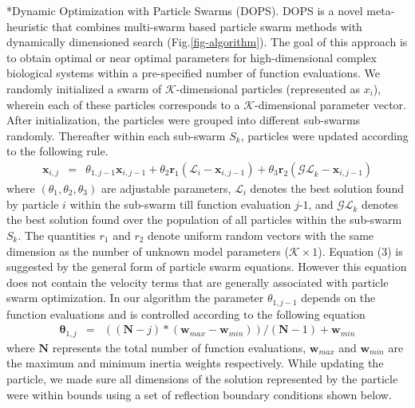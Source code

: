 \documentclass[12pt]{article}
\makeatletter
\renewcommand\subsection{\@startsection
	{subsection}{2}{0mm}
	{-0.05in}
	{-0.5\baselineskip}
	{\normalfont\normalsize\bfseries}}
\makeatother
\begin{document}
\subsection*{Dynamic Optimization with Particle Swarms (DOPS).}
DOPS is a novel meta-heuristic that combines multi-swarm based particle swarm methods with dynamically dimensioned search (Fig.\ref{fig-algorithm}).
The goal of this approach is to obtain optimal or near optimal parameters for high-dimensional complex biological systems within a pre-specified number of function evaluations. We randomly initialized a swarm of $\mathcal{K}$-dimensional particles (represented as ${x}_{i}$), wherein each of these particles corresponds to a $\mathcal{K}$-dimensional parameter vector. After initialization, the particles were grouped into different sub-swarms randomly. Thereafter within each sub-swarm ${S}_{k}$,  particles were updated according to the following rule.
\begin{eqnarray}
	\mathbf{x}_{i,j} &=&\theta_{1,j-1}\mathbf{x}_{i,j-1} + \theta_{2}\mathbf{r}_{1}\left(\mathcal{L}_{i} - \mathbf{x}_{i,j-1}\right) + \theta_{3}\mathbf{r}_{2}\left(\mathcal{GL}_{k} - \mathbf{x}_{i,j-1}\right)
\end{eqnarray}
where $\left(\theta_{1},\theta_{2},\theta_{3}\right)$ are adjustable parameters, $\mathcal{L}_{i}$ denotes the best solution found by particle $i$ within the sub-swarm till function evaluation $j$-$1$, and
$\mathcal{GL}_{k}$ denotes the best solution found over the population of all particles within the sub-swarm ${S}_{k}$. The quantities $r_{1}$ and $r_{2}$ denote uniform random vectors with the same dimension as the number of unknown model
parameters ($\mathcal{K}\times{1}$). Equation (3) is suggested by the general form of particle swarm equations. However this equation does not contain the velocity terms that are generally associated with particle swarm optimization. In our algorithm the parameter $\theta_{1,j-1}$ depends on the function evaluations and is controlled according to the following equation
\begin{eqnarray}
	\mathbf \theta_{1,j}&=&((\mathbf{N}-{j})*(\mathbf{w}_{max}-\mathbf{w}_{min}))/(\mathbf{N}-{1}) + \mathbf{w}_{min}
\end{eqnarray}
where $\mathbf{N}$ represents the total number of function evaluations, $\mathbf{w}_{max}$ and $\mathbf{w}_{min}$ are the maximum and minimum inertia weights respectively. While updating the particle, we made sure all dimensions of the solution represented by the particle were within bounds using a set of reflection boundary conditions shown below. 
\end{document}
